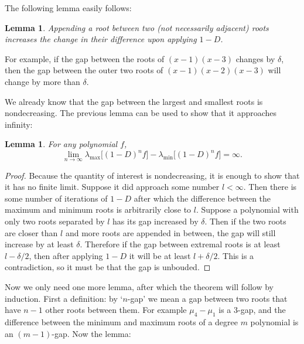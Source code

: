 \documentclass[11pt]{article}
\newtheorem{lemma}[theorem]{Lemma}
\begin{document}
The following lemma easily follows:

\begin{lemma}
	Appending a root between two (not necessarily adjacent) roots increases the change in their difference upon applying $1-D$.
\end{lemma}
For example, if the gap between the roots of $(x-1)(x-3)$ changes by $\delta$, then the gap between the outer two roots of $(x-1)(x-2)(x-3)$ will change by more than $\delta$.

We already know that the gap between the largest and smallest roots is nondecreasing. The previous lemma can be used to show that it approaches infinity:

\begin{lemma}
	For any polynomial $f$,
	 \[ \lim_{n\to\infty} \lambda_{\max}\big[(1-D)^n f\big]-\lambda_{\min}\big[(1-D)^n f\big] = \infty. \]
\end{lemma}
\begin{proof}
	Because the quantity of interest is nondecreasing, it is enough to show that it has no finite limit. Suppose it did approach some number $l < \infty$. Then there is some number of iterations of $1-D$ after which the difference between the maximum and minimum roots is arbitrarily close to $l$. Suppose a polynomial with only two roots separated by $l$ has its gap increased by $\delta$. Then if the two roots are closer than $l$ and more roots are appended in between, the gap will still increase by at least $\delta$. Therefore if the gap between extremal roots is at least $l - \delta/2$, then after applying $1-D$ it will be at least $l + \delta/2$. This is a contradiction, so it must be that the gap is unbouded.
\end{proof}

Now we only need one more lemma, after which the theorem will follow by induction. First a definition: by `$n$-gap' we mean a gap between two roots that have $n-1$ other roots between them. For example $\mu_4-\mu_1$ is a 3-gap, and the difference between the minimum and maximum roots of a degree $m$ polynomial is an $(m-1)$-gap. Now the lemma:
\end{document}
